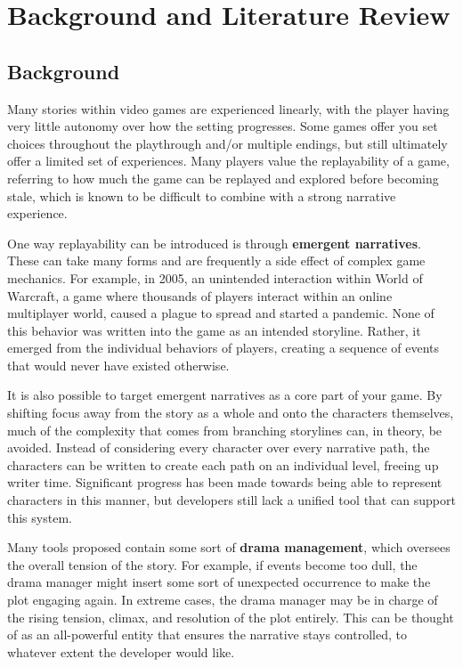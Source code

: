 \chapter{Background and Literature Review} \label{sec:BackgroundAndLiteratureReview}

\section{Background} \label{sec:Background}

Many stories within video games are experienced linearly, with the player
having very little autonomy over how the setting progresses. Some games offer you
set choices throughout the playthrough and\slash or multiple endings, but still ultimately
offer a limited set of experiences. Many players value the replayability of a game,
referring to how much the game can be replayed and explored before becoming stale,
which is known to be difficult to combine with a strong narrative experience.

One way replayability can be introduced is through \textbf{emergent narratives}. These
can take many forms and are frequently a side effect of complex game mechanics. For
example, in 2005, an unintended interaction within World of Warcraft, a game where
thousands of players interact within an online multiplayer world, caused a plague
to spread and started a pandemic. \cite{andrei_weird_2020} None of this behavior was
written into the game as an intended storyline. Rather, it emerged from the individual
behaviors of players, creating a sequence of events that would never have existed
otherwise.

It is also possible to target emergent narratives as a core part of your game.
By shifting focus away from the story as a whole and onto the characters themselves,
much of the complexity that comes from branching storylines can, in theory, be avoided. Instead
of considering every character over every narrative path, the characters can be written
to create each path on an individual level, freeing up writer time.
Significant progress has been made towards being able to represent characters in this
manner, but developers still lack a unified tool that can support this system.

Many tools proposed contain some sort of \textbf{drama management}, which oversees the
overall tension of the story. For example, if events become too dull, the drama
manager might insert some sort of unexpected occurrence to make the plot engaging
again. In extreme cases, the drama manager may be in charge of the rising tension,
climax, and resolution of the plot entirely. This can be thought of as an
all-powerful entity that ensures the narrative stays controlled, to whatever
extent the developer would like.

